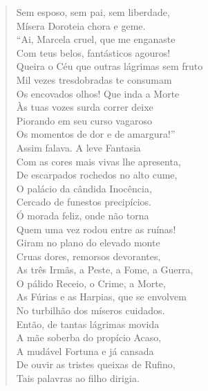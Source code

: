 \begin{verse}
Sem esposo, sem pai, sem liberdade,\\
Mísera Doroteia chora e geme.\\
``Ai, Marcela cruel, que me enganaste\\
Com teus belos, fantásticos agouros!\\
Queira o Céu que outras lágrimas sem fruto\\
Mil vezes tresdobradas te consumam\\
Os encovados olhos! Que inda a Morte\\
Às tuas vozes surda correr deixe\\
Piorando em seu curso vagaroso\\
Os momentos de dor e de amargura!'' \\[10pt]


Assim falava. A leve Fantasia\\
Com as cores mais vivas lhe apresenta,\\
De escarpados rochedos no alto cume,\\
O palácio da cândida Inocência,\\
Cercado de funestos precipícios.\\
Ó morada feliz, onde não torna\\
Quem uma vez rodou entre as ruínas!\\
Giram no plano do elevado monte\\
Cruas dores, remorsos devorantes,\\
As três Irmãs, a Peste, a Fome, a Guerra,\\
O pálido Receio, o Crime, a Morte,\\
As Fúrias e as Harpias, que se envolvem\\
No turbilhão dos míseros cuidados. \\[10pt]


Então, de tantas lágrimas movida\\
A mãe soberba do propício Acaso,\\      \index{\Acaso}
A mudável Fortuna e já cansada\\           \index{\Fortu}
De ouvir as tristes queixas de Rufino,\\
Tais palavras ao filho dirigia. \\[10pt]



\end{verse}
